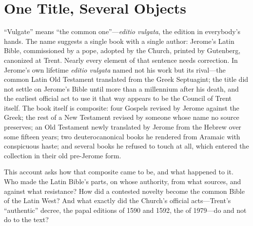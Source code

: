 \section{One Title, Several Objects}

``Vulgate'' means ``the common one''---\textit{editio vulgata}, the edition
in everybody's hands. The name suggests a single book with a single author:
Jerome's Latin Bible, commissioned by a pope, adopted by the Church, printed
by Gutenberg, canonized at Trent. Nearly every element of that sentence
needs correction. In Jerome's own lifetime \textit{editio vulgata} named not
his work but its rival---the common Latin Old Testament translated from the
Greek Septuagint; the title did not settle on Jerome's Bible until more than
a millennium after his death, and the earliest official act to use it that
way appears to be the Council of Trent
itself. The book itself is composite: four Gospels revised by Jerome
against the Greek; the rest of a New Testament revised by someone whose
name no source preserves; an Old Testament newly translated by Jerome from
the Hebrew over some fifteen years; two deuterocanonical books he rendered
from Aramaic with conspicuous haste; and several books he refused to touch
at all, which entered the collection in their old pre-Jerome form.

This account asks how that composite came to be, and what happened to it.
Who made the Latin Bible's parts, on whose authority, from what sources,
and against what resistance? How did a contested novelty become the common
Bible of the Latin West? And what exactly did the Church's official
acts---Trent's ``authentic'' decree, the papal editions of 1590 and 1592,
the  of 1979---do and not do to the text?


